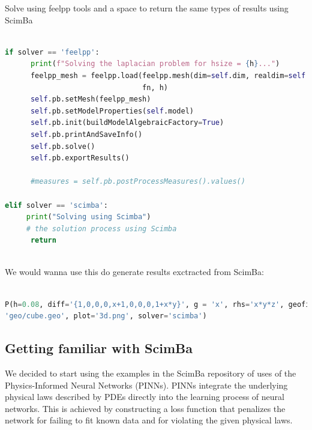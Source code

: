 \documentclass[12pt]{article}
\begin{document}
\newpage

Solve using feelpp tools and a space to return the same types of results using ScimBa

\begin{lstlisting}[language=Python,caption={},frame=single, backgroundcolor=\color{gray!10}, basicstyle=\footnotesize,rulecolor=\color{blue}, framexleftmargin=3pt, commentstyle=\color{mygreen}, keywordstyle=\color{blue}]

if solver == 'feelpp':
      print(f"Solving the laplacian problem for hsize = {h}...")
      feelpp_mesh = feelpp.load(feelpp.mesh(dim=self.dim, realdim=self.dim), 
                                fn, h)
      self.pb.setMesh(feelpp_mesh)
      self.pb.setModelProperties(self.model)
      self.pb.init(buildModelAlgebraicFactory=True)
      self.pb.printAndSaveInfo()
      self.pb.solve()
      self.pb.exportResults()
    
      #measures = self.pb.postProcessMeasures().values()

elif solver == 'scimba':
     print("Solving using Scimba")
     # the solution process using Scimba
      return
      
\end{lstlisting}

We would wanna use this do generate results exctracted from ScimBa:

\begin{lstlisting}[language=Python,caption={},frame=single, backgroundcolor=\color{gray!10}, basicstyle=\footnotesize,rulecolor=\color{blue}, framexleftmargin=3pt, commentstyle=\color{mygreen}, keywordstyle=\color{blue}]

P(h=0.08, diff='{1,0,0,0,x+1,0,0,0,1+x*y}', g = 'x', rhs='x*y*z', geofile = 
'geo/cube.geo', plot='3d.png', solver='scimba') 

\end{lstlisting}

\newpage

\subsection{Getting familiar with ScimBa}

We decided to start using the examples in the ScimBa repository of uses of the Physics-Informed Neural Networks (PINNs). PINNs integrate the underlying physical laws described by PDEs directly into the learning process of neural networks. This is achieved by constructing a loss function that penalizes the network for failing to fit known data and for violating the given physical laws.
\end{document}
